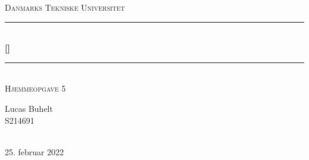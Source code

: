 \begin{titlepage}
\newcommand{\HRule}{\rule{\linewidth}{0.5mm}}
\center
\textsc{\LARGE Danmarks Tekniske Universitet}\\[1.7cm]
\HRule\\[0.5cm]
{\huge\bfseries [\Kursusenummer]  \Kursusnavn}\\[0.4cm]
\HRule\\[0.5cm]
\textsc{\Large Hjemmeopgave 5}\\[1cm]
\begin{minipage}{0.5\textwidth}
\begin{flushleft}
\centering
Lucas Buhelt\\
S214691\\[0.8cm]
\end{flushleft}
\end{minipage}
\\[1cm]
\vfill \vfill
\vfill\vfill\vfill
{\large 25. februar 2022}
\vfill
\end{titlepage}